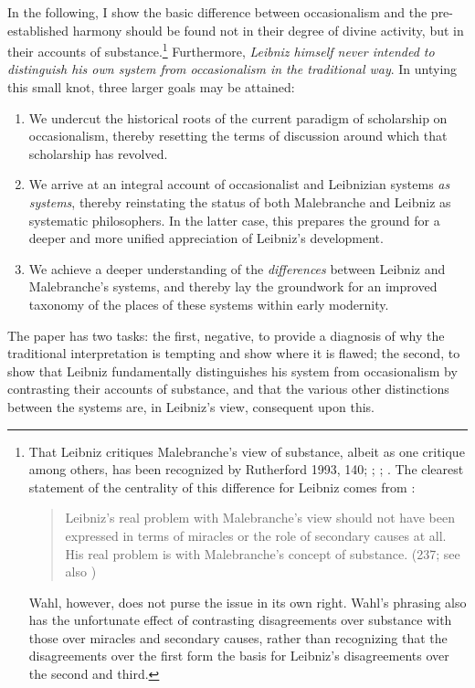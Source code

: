 \documentclass{article}
\begin{document}
In the following, I show the basic difference between occasionalism and
the pre-established harmony should be found not in their degree of
divine activity, but in their accounts of substance.\footnote{That
  Leibniz critiques Malebranche's view of substance, albeit as one
  critique among others, has been recognized by Rutherford 1993, 140;
  \autocite[299-301]{Garber1995}; \autocite[193-194]{Garber2009}; \autocite[280-281, fn. 16]{Brown2000}. The
  clearest statement of the centrality of this difference for Leibniz
  comes from \autocite{Wahl2011}:

  \begin{quote}
  Leibniz's real problem with Malebranche's view should not have been
  expressed in terms of miracles or the role of secondary causes at all.
  His real problem is with Malebranche's concept of substance. (237; see
  also \autocite{Whipple2010})
  \end{quote}

  Wahl, however, does not purse the issue in its own right. Wahl's
  phrasing also has the unfortunate effect of contrasting disagreements
  over substance with those over miracles and secondary causes, rather
  than recognizing that the disagreements over the first form the basis
  for Leibniz's disagreements over the second and third.} Furthermore,
\emph{Leibniz himself never intended to distinguish his own system from
occasionalism in the traditional way}. In untying this small knot, three
larger goals may be attained:

\begin{enumerate}
\item We undercut the historical roots of the current paradigm of
  scholarship on occasionalism, thereby resetting the terms of
  discussion around which that scholarship has revolved.
\item We arrive at an integral account of occasionalist and Leibnizian
  systems \emph{as systems}, thereby reinstating the status of both
  Malebranche and Leibniz as systematic philosophers. In the latter
  case, this prepares the ground for a deeper and more unified
  appreciation of Leibniz's development.
\item We achieve a deeper understanding of the \emph{differences} between
  Leibniz and Malebranche's systems, and thereby lay the groundwork for
  an improved taxonomy of the places of these systems within early
  modernity.
\end{enumerate}

The paper has two tasks: the first, negative, to provide a diagnosis of
why the traditional interpretation is tempting and show where it is
flawed; the second, to show that Leibniz fundamentally distinguishes his
system from occasionalism by contrasting their accounts of substance,
and that the various other distinctions between the systems are, in
Leibniz's view, consequent upon this.
\end{document}
